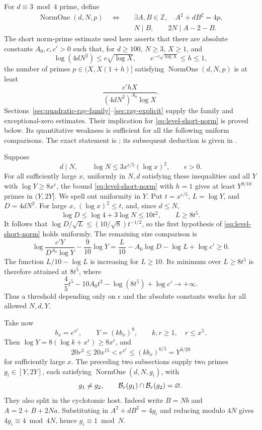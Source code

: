 For \(d\equiv3\bmod4\) prime, define
\[
 \begin{split}
 \operatorname{NormOne}(d,N,p)\quad\Longleftrightarrow\quad&
 \exists A,B\in\mathbb Z,\quad A^2+dB^2=4p,\\
 &N\mid B,\qquad 2N\mid A-2-B .
 \end{split}
\]
The short norm-prime estimate used here asserts that there are
absolute constants \(A_0,c,c'>0\) such that, for
\(d\geq100\), \(N\geq3\), \(X\geq1\), and
\[
 \log(4dN^2)\leq c\sqrt{\log X},\qquad
 e^{-c\sqrt{\log X}}\leq h\leq1 ,
\]
the number of primes \(p\in(X,X(1+h)]\) satisfying
\(\operatorname{NormOne}(d,N,p)\) is at least
\begin{equation}
 \label{eq:level-short-norm}
           \frac{c'hX}{(4dN^2)^{A_0}\log X}.
\end{equation}
Sections~\ref{sec:quadratic-ray-family}--\ref{sec:ray-explicit} supply
the family and exceptional-zero estimates. Their implication for
\eqref{eq:level-short-norm} is proved below.
Its quantitative weakness is sufficient for all
the following uniform comparisons.
The exact statement is
;
its subsequent deduction is given in
.

Suppose
\[
 d\mid N,\qquad
 \log N\leq3x^{\epsilon/5}(\log x)^2,\qquad \epsilon>0 .
\]
For all sufficiently large \(x\), uniformly in \(N,d\) satisfying
these inequalities and all \(Y\) with \(\log Y\geq8x^\epsilon\),
the bound \eqref{eq:level-short-norm} with \(h=1\) gives at least
\(Y^{9/10}\) primes in \((Y,2Y]\).
We spell out uniformity in \(Y\).
Put \(t=x^{\epsilon/5}\), \(L=\log Y\), and \(D=4dN^2\).
For large \(x\),
\((\log x)^2\leq t\), and, since \(d\leq N\),
\[
        \log D\leq\log4+3\log N\leq10t^2,
                  \qquad L\geq8t^5 .
\]
It follows that
\(\log D/\sqrt L\leq(10/\sqrt8)t^{-1/2}\), so the first
hypothesis of \eqref{eq:level-short-norm} holds uniformly.
The remaining size comparison is
\[
 \log\frac{c'Y}{D^{A_0}\log Y}
             -\frac9{10}\log Y
       =\frac L{10}-A_0\log D-\log L+\log c'\geq0 .
\]
The function \(L/10-\log L\) is increasing for \(L\geq10\).
Its minimum over \(L\geq8t^5\) is therefore attained at \(8t^5\),
where
\[
 \frac45t^5-10A_0t^2-\log(8t^5)+\log c'\longrightarrow+\infty .
\]
Thus a threshold depending only on \(\epsilon\) and the absolute
constants works for all allowed \(N,d,Y\).

Take now
\[
             b_x=e^{x^\epsilon},\qquad Y=(k b_x)^8,
             \qquad k,r\geq1,\quad r\leq x^5 .
\]
Then \(\log Y=8(\log k+x^\epsilon)\geq8x^\epsilon\), and
\[
       20r^3\leq20x^{15}<e^{x^\epsilon}
                       \leq(kb_x)^{6/5}=Y^{3/20}
\]
for sufficiently large \(x\). The preceding two subsections supply
two primes \(g_i\in[Y,2Y]\), each satisfying
\(\operatorname{NormOne}(d,N,g_i)\), with
\[
                g_1\ne g_2,\qquad
                  {\cal B}_r(g_1)\cap{\cal B}_r(g_2)=\varnothing .
\]
They also split in the cyclotomic host.
Indeed write \(B=Nb\) and \(A=2+B+2Na\). Substituting in
\(A^2+dB^2=4g_i\) and reducing modulo \(4N\) gives
\(4g_i\equiv4\bmod4N\), hence \(g_i\equiv1\bmod N\).

